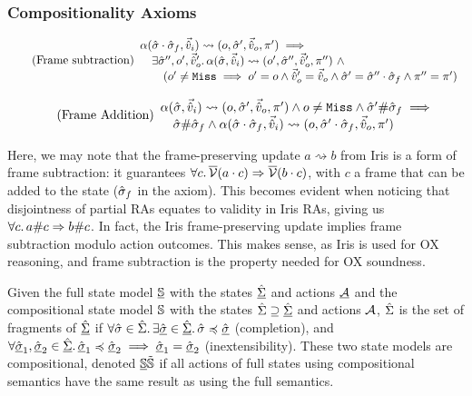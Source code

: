 \subsubsection{Compositionality Axioms}

\begin{equation}
\tag{Frame subtraction}\label{eq:frame-sub}
\begin{array}{l}
\alpha(\hat{\sigma}\cdot\hat{\sigma}_f,\vec{\hat{v}}_i)\rightsquigarrow(o, \hat{\sigma}',\vec{\hat{v}}_o,\pi') \implies \\
\quad\exists \hat{\sigma}'', o', \vec{\hat{v}}_o'\ldotp \alpha(\hat{\sigma},\vec{\hat{v}}_i)\rightsquigarrow(o', \hat{\sigma}'', \vec{\hat{v}}_o', \pi'') ~\land \\
\qquad(o' \neq \texttt{Miss} \implies o' = o \land  \vec{\hat{v}}_o' = \vec{\hat{v}}_o \land \hat{\sigma}' = \hat{\sigma}'' \cdot \hat{\sigma}_f \land \pi'' = \pi')
\end{array}
\end{equation}

\begin{equation}
\tag{Frame Addition}\label{eq:frame-add}
\begin{array}{l}
\alpha(\hat{\sigma},\vec{\hat{v}}_i)\rightsquigarrow(o, \hat{\sigma}', \vec{\hat{v}}_o, \pi') \land o \neq \texttt{Miss} \land \hat{\sigma}'\#\hat{\sigma}_f\implies\\
\quad\hat{\sigma} \# \hat{\sigma}_f \land \alpha(\hat{\sigma}\cdot\hat{\sigma}_f, \vec{\hat{v}}_i)\rightsquigarrow(o, \hat{\sigma}'\cdot\hat{\sigma}_f, \vec{\hat{v}}_o, \pi')
\end{array}
\end{equation}

Here, we may note that the frame-preserving update $a \rightsquigarrow b$ from Iris is a form of frame subtraction: it guarantees $\forall c\ldotp \overline{\cal V}(a \cdot c)\Rightarrow \overline{\cal V}(b\cdot c)$, with $c$ a frame that can be added to the state ($\hat{\sigma}_f$ in the axiom). This becomes evident when noticing that disjointness of partial RAs equates to validity in Iris RAs, giving us $\forall c\ldotp a\# c\Rightarrow b\# c$. In fact, the Iris frame-preserving update implies frame subtraction modulo action outcomes. This makes sense, as Iris is used for OX reasoning, and frame subtraction is the property needed for OX soundness. 

Given the full state model $\underline{\mathbb S}$ with the states $\underline{\hat{\Sigma}}$ and actions $\underline{{\cal{A}}}$ and the compositional state model $\mathbb S$ with the states $\hat{\Sigma}\supseteq\underline{\hat{\Sigma}}$ and actions ${\cal{A}}$, $\hat{\Sigma}$ is the set of fragments of $\underline{\hat{\Sigma}}$ if ${\forall \hat{\sigma}\in\hat{\Sigma}\ldotp \exists\underline{\hat{\sigma}}\in\underline{\hat{\Sigma}}\ldotp \hat{\sigma}\preccurlyeq\underline{\hat{\sigma}}}$ (completion), and ${\forall\underline{\hat{\sigma}}_1,\underline{\hat{\sigma}}_2\in\underline{\hat{\Sigma}}\ldotp \underline{\hat{\sigma}}_1\preccurlyeq\underline{\hat{\sigma}}_2 \implies \underline{\hat{\sigma}}_1=\underline{\hat{\sigma}}_2}$ (inextensibility).  These two state models are compositional, denoted $\underline{\mathbb S} \tilde {\mathbb S}$ if all actions of full states using compositional semantics have the same result as using the full semantics.

